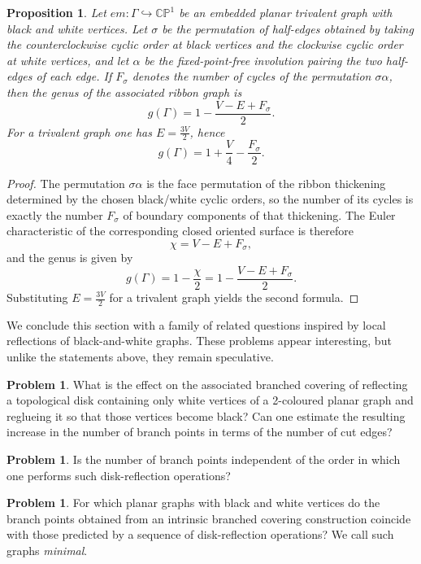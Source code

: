 \documentclass[reqno]{amsart}
\newtheorem{proposition}[theorem]{Proposition}
\theoremstyle{definition}
\newtheorem{problem}[theorem]{Problem}
\newcommand {\Ga}{\Gamma}
\newcommand {\bCP} {\mathbb {CP}}
\begin{document}
\begin{proposition}\label{pr:bwgenus}
Let $em:\Ga\hookrightarrow \bCP^1$ be an embedded planar trivalent graph with black and white vertices. Let $\sigma$ be the permutation of half-edges obtained by taking the counterclockwise cyclic order at black vertices and the clockwise cyclic order at white vertices, and let $\alpha$ be the fixed-point-free involution pairing the two half-edges of each edge. If $F_\sigma$ denotes the number of cycles of the permutation $\sigma\alpha$, then the genus of the associated ribbon graph is
\[
g(\Ga)=1-\frac{V-E+F_\sigma}{2}.
\]
For a trivalent graph one has $E=\frac{3V}{2}$, hence
\[
g(\Ga)=1+\frac{V}{4}-\frac{F_\sigma}{2}.
\]
\end{proposition}

\begin{proof}
The permutation $\sigma\alpha$ is the face permutation of the ribbon thickening determined by the chosen black/white cyclic orders, so the number of its cycles is exactly the number $F_\sigma$ of boundary components of that thickening. The Euler characteristic of the corresponding closed oriented surface is therefore
\[
\chi=V-E+F_\sigma,
\]
and the genus is given by
\[
g(\Ga)=1-\frac{\chi}{2}=1-\frac{V-E+F_\sigma}{2}.
\]
Substituting $E=\frac{3V}{2}$ for a trivalent graph yields the second formula.
\end{proof}

\medskip
We conclude this section with a family of related questions inspired by local reflections of black-and-white graphs. These problems appear interesting, but unlike the statements above, they remain speculative.

\begin{problem}
What is the effect on the associated branched covering of reflecting a topological disk containing only white vertices of a 2-coloured planar graph and reglueing it so that those vertices become black? Can one estimate the resulting increase in the number of branch points in terms of the number of cut edges?
\end{problem}

\begin{problem}
Is the number of branch points independent of the order in which one performs such disk-reflection operations?
\end{problem}

\begin{problem}
For which planar graphs with black and white vertices do the branch points obtained from an intrinsic branched covering construction coincide with those predicted by a sequence of disk-reflection operations? We call such graphs \emph{minimal}.
\end{problem}
\end{document}
